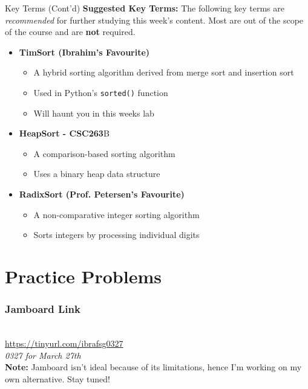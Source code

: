 \documentclass[hyperref={colorlinks,citecolor=blue,linkcolor=blue,urlcolor=blue}, aspectratio=1610]{beamer}
\begin{document}
\begin{frame}{Key Terms (Cont'd)}
  \textbf{Suggested Key Terms:} The following key terms are \textit{recommended} for further studying this week's content. Most are out of the scope of the course and are \textbf{not} required. 
  \begin{itemize} 
    \item \textbf{TimSort (Ibrahim's Favourite)}
    \begin{itemize}
      \item A hybrid sorting algorithm derived from merge sort and insertion sort
      \item Used in Python's \texttt{sorted()} function
      \item Will haunt you in this weeks lab
    \end{itemize}
    \item \textbf{HeapSort - CSC263}B
    \begin{itemize}
      \item A comparison-based sorting algorithm
      \item Uses a binary heap data structure
    \end{itemize}
    \item \textbf{RadixSort (Prof. Petersen's Favourite)}
    \begin{itemize}
      \item A non-comparative integer sorting algorithm
      \item Sorts integers by processing individual digits
    \end{itemize}
  \end{itemize}

\end{frame}

\section{Practice Problems}

\begin{frame}
  \frametitle{Jamboard Link}
  \begin{center}
    \\
    \url{https://tinyurl.com/ibrafsg0327}\\
    \textit{0327 for March 27th}\\
    \textbf{Note:} Jamboard isn't ideal because of its limitations, hence I'm working on my own alternative. Stay tuned!
  \end{center}
\end{frame}
\end{document}
